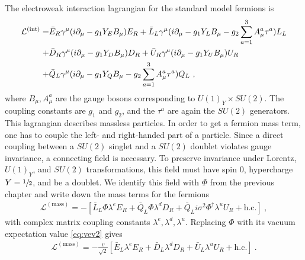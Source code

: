 The electroweak interaction lagrangian for the standard model fermions is
\begin{align}\label{eq:LFermion}
	\mathcal{L}^{(\text{int})} = &\bar{E}_R\gamma^\mu(i\partial_\mu-g_1Y_EB_\mu)E_R + \bar{L}_L\gamma^\mu(i\partial_\mu-g_1Y_LB_\mu-g_2\sum_{a=1}^{3}A_\mu^a\tau^a)L_L \notag \\
	+ &\bar{D}_R\gamma^\mu(i\partial_\mu-g_1Y_DB_\mu)D_R + \bar{U}_R\gamma^\mu(i\partial_\mu-g_1Y_UB_\mu)U_R \notag \\
	+ &\bar{Q}_L\gamma^\mu(i\partial_\mu-g_1Y_QB_\mu-g_2\sum_{a=1}^{3}A_\mu^a\tau^a)Q_L \ ,
\end{align}
where $B_\mu, A_\mu^a$ are the gauge bosons corresponding to $U(1)_Y\times SU(2)$. The coupling constants are $g_1$ and $g_2$, and the $\tau^a$ are again the $SU(2)$ generators. This lagrangian describes massless particles. In order to get a fermion mass term, one has to couple the left- and right-handed part of a particle. Since a direct coupling between a $SU(2)$ singlet and a $SU(2)$ doublet violates gauge invariance, a connecting field is necessary. To preserve invariance under Lorentz, $U(1)_Y$, and $SU(2)$ transformations, this field must have spin 0, hypercharge $Y=\sfrac{1}{2}$, and be a doublet. We identify this field with $\Phi$ from the previous chapter and write down the mass terms for the fermions
\begin{align}
	\mathcal{L}^{(\text{mass})} = -\left[\bar{L}_L\Phi\lambda^e  E_R  + \bar{Q}_L\Phi\lambda^d D_R + \bar{Q}_Li\sigma^2\Phi^\dagger\lambda^u U_R + \text{h.c.}\right] \ ,
\end{align}
with complex matrix coupling constants $\lambda^e,\lambda^d,\lambda^u$. Replacing $\Phi$ with its vacuum expectation value \eqref{eq:vev2} gives
\begin{align}\label{eq:LMass}
	\mathcal{L}^{(\text{mass})} = -\frac{v}{\sqrt{2}}\left[ \bar{E}_L\lambda^e E_R  + \bar{D}_L \lambda^dD_R + \bar{U}_L\lambda^u U_R + \text{h.c.}\right] \ .
\end{align}



